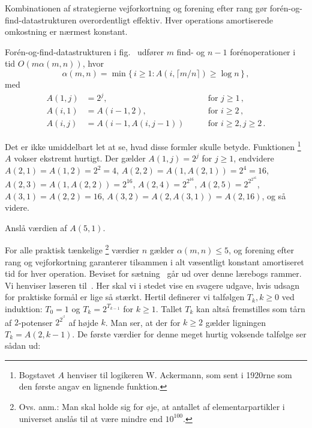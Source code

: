 Kombinationen af strategierne vejforkortning og forening efter rang gør forén-og-find-datastrukturen overordentligt effektiv.
Hver operations amortiserede omkostning er nærmest konstant.

\begin{thm}
  Forén-og-find-datastrukturen i fig.~ udfører $m$ find- og $n-1$ forén\-operationer i tid $O(m\alpha(m,n))$, hvor
\[ 
  \alpha(m,n) = \min\{\,i\geq 1\colon A(i,\lceil m/n\rceil)\geq \log n\,\}\,,
\]
  med
  \begin{align*}
    A(1,j)&= 2^j,&\text{for } j\geq 1\,,\\
    A(i,1)&= A(i-1,2),&\text{for } i\geq 2\,,\\
    A(i,j)&=A(i-1,A(i,j-1)) \qquad &\text{for } i\geq 2,j\geq 2\,.
  \end{align*}
\end{thm}

Det er ikke umiddelbart let at se, hvad disse formler skulle betyde.
Funktionen%
\footnote{Bogstavet $A$ henviser til logikeren W. Ackermann, som sent i 1920rne som den første angav en lignende funktion.}
$A$ vokser ekstremt hurtigt.
Der gælder $A(1,j)=2^j$ for $j\geq 1$, endvidere $A(2,1)=A(1,2)=2^2=4$, $A(2,2)=A(1,A(2,1))=2^4= 16$, $A(2,3)=A(1,A(2,2)) = 2^{16}$,
$A(2,4)=2^{2^{16}}$, 
$A(2,5)=2^{2^{2^{16}}}$, 
$A(3,1)=A(2,2)=16$,
$A(3,2)=A(2,A(3,1))=A(2,16)$, og så videre.

\begin{exerc}
 Anslå værdien af $A(5,1)$.
\end{exerc}

For alle praktisk tænkelige
\footnote{Ovs. anm.: Man skal holde sig for øje, at antallet af elementarpartikler i universet anslås til at være mindre end $10^{100}$.}
værdier $n$ gælder $\alpha(m,n)\leq 5$, og forening efter rang og vejforkortning garanterer tilsammen i alt væsentligt konstant amortiseret tid for hver operation.
Beviset for sætning~ går ud over denne lærebogs rammer.
Vi henviser læseren til~\cite{Tarjan:union-find,Seidel:union-find}.
Her skal vi i stedet vise en svagere udgave, hvis udsagn for praktiske formål er lige så stærkt.
Hertil definerer vi talfølgen $T_k, k\geq 0$ ved induktion: 
$T_0=1$ og $T_k= 2^{T_{k-1}}$ for $k\geq 1$.
Tallet $T_k$ kan altså fremstilles som tårn af $2$-potenser $2^{2^{\vdots^2}}$ af højde $k$.
Man ser, at der for $k\geq 2$ gælder ligningen $T_k = A(2,k-1)$.
De første værdier for denne meget hurtig voksende talfølge ser sådan ud:

